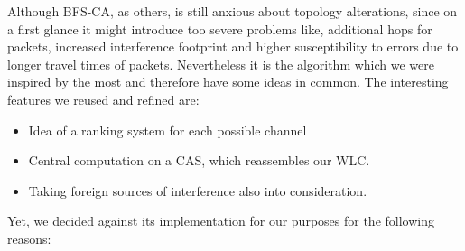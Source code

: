     Although \ac{BFS-CA}, as others, is still anxious about topology alterations, since on a first glance it might introduce too severe problems like, 
    additional hops for packets, increased interference footprint and higher susceptibility to errors due to longer travel times of packets.
    Nevertheless it is the algorithm which we were inspired by the most and therefore have some ideas in common.
    The interesting features we reused and refined are:
    
    \begin{itemize}
     \item Idea of a ranking system for each possible channel
     
     \item Central computation on a \ac{CAS}, which reassembles our \ac{WLC}.
     
     \item Taking foreign sources of interference also into consideration.
     
    \end{itemize}
    
\newpage
    
    Yet, we decided against its implementation for our purposes for the following reasons:
    
